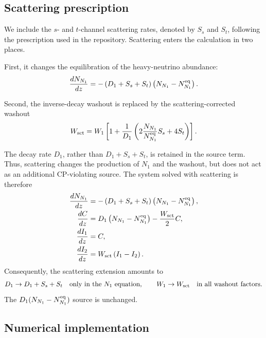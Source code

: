 \subsection{Scattering prescription}

We include the $s$- and $t$-channel scattering rates, denoted by $S_s$ and
$S_t$, following the prescription used in the repository.  Scattering enters
the calculation in two places.

First, it changes the equilibration of the heavy-neutrino abundance:
\begin{equation}
 \frac{dN_{N_1}}{dz}
 =-\left(D_1+S_s+S_t\right)
   \left(N_{N_1}-N_{N_1}^{\rm eq}\right).
 \label{eq:n1-with-scattering}
\end{equation}

Second, the inverse-decay washout is replaced by the scattering-corrected
washout
\begin{equation}
 W_{\rm sct}
 =W_1\left[
 1+\frac{1}{D_1}
 \left(
  2\frac{N_{N_1}}{N_{N_1}^{\rm eq}}S_s+4S_t
 \right)
 \right].
 \label{eq:scattering-washout}
\end{equation}

The decay rate $D_1$, rather than $D_1+S_s+S_t$, is retained in the source
term.  Thus, scattering changes the production of $N_1$ and the washout, but
does not act as an additional CP-violating source.  The system solved with
scattering is therefore
\begin{align}
 \frac{dN_{N_1}}{dz}
   &= -\left(D_1+S_s+S_t\right)
      \left(N_{N_1}-N_{N_1}^{\rm eq}\right),\\
 \frac{dC}{dz}
   &= D_1\left(N_{N_1}-N_{N_1}^{\rm eq}\right)
      -\frac{W_{\rm sct}}{2}C,\\
 \frac{dI_1}{dz} &= C,\\
 \frac{dI_2}{dz} &= W_{\rm sct}\left(I_1-I_2\right).
 \label{eq:i2-system-scattering}
\end{align}
Consequently, the scattering extension amounts to
\begin{equation}
 D_1\rightarrow D_1+S_s+S_t
 \quad\text{only in the $N_1$ equation},
 \qquad
 W_1\rightarrow W_{\rm sct}
 \quad\text{in all washout factors}.
\end{equation}
The $D_1(N_{N_1}-N_{N_1}^{\rm eq})$ source is unchanged.

\subsection{Numerical implementation}

